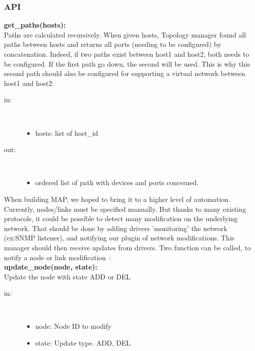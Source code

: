\subsubsection{API}
\textbf{get\_paths(hosts):}\\
Paths are calculated recursively. When given hosts, Topology manager found all paths between hosts and returns all ports (needing to be configured) by concatenation. Indeed, if two paths exist between host1 and host2, both needs to be configured. If the first path go down, the second will be used. This is why this second path should also be configured for supporting a virtual network between host1 and host2.\\
\begin{description}
    \item[in:] \hfill \\
        \begin{itemize}
            \item hosts: list of host\_id
        \end{itemize}
    \item[out:] \hfill \\
        \begin{itemize}
            \item ordered list of path with devices and ports concerned.
        \end{itemize}
\end{description}
When building MAP, we hoped to bring it to a higher level of automation. Currently, nodes/links must be specified manually. But thanks to many existing protocols, it could be possible to detect many modification on the underlying network. That should be done by adding drivers 'monitoring' the network (ex:SNMP listener), and notifying our plugin of network modifications.
This manager should then receive updates from drivers. Two function can be called, to notify a node or link modification~:\\[1\baselineskip]
\textbf{update\_node(node, state):}\\
Update the node with state ADD or DEL
\begin{description}
    \item[in:] \hfill \\
        \begin{itemize}
            \item node: Node ID to modify
            \item state: Update type. ADD, DEL
        \end{itemize}
\end{description}

